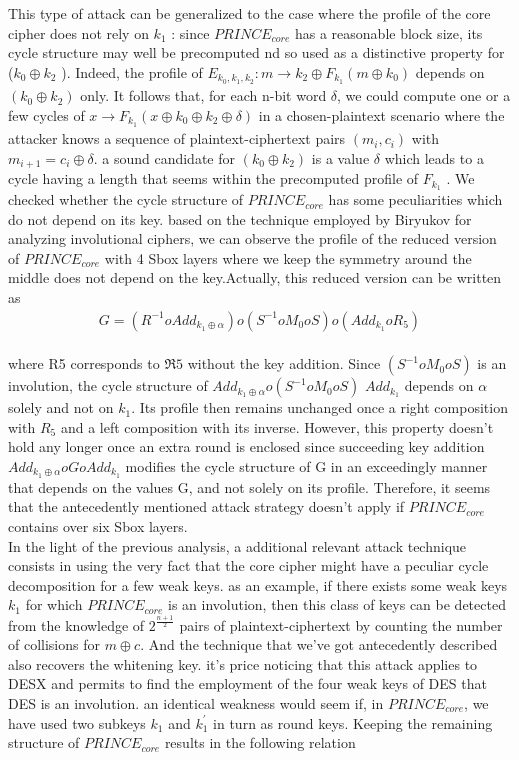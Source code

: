 \documentclass{transcrypto}
\begin{document}
This type of attack can be generalized to the case where the profile of the core cipher does not rely on $k_{1}$ : since $PRINCE_{core}$ has a reasonable block size, its cycle structure may well be precomputed nd so used as a distinctive property for ($k_{0} \oplus k_{2}$ ). Indeed, the profile of $E_{k_{0} ,k_{1},k_{2}}: m \xrightarrow[]{} k_{2} \oplus F_{k_{1}}(m \oplus k_{0})$
depends on $(k_{0} \oplus k_{2})$ only. It follows that, for each n-bit word $\delta$, we could compute
one or a few cycles of $x \xrightarrow[]{} F_{k_{1}}(x \oplus k_{ 0}  \oplus k_{2} \oplus \delta)$ in a chosen-plaintext scenario where the attacker knows a sequence of plaintext-ciphertext pairs $(m_{i} , c_{i} )$ with $m_{i+1} = c_{i} \oplus \delta$. a sound candidate for $(k_{0} \oplus k_{2} )$ is a value $\delta$ which leads to a cycle having a length that seems within the precomputed profile of $F_{k_{1}}$ . We checked whether the cycle structure of $PRINCE_{core}$ has some peculiarities which do not depend on its key. based on the technique employed by Biryukov for analyzing involutional ciphers, we can observe the profile of the reduced version of $PRINCE_{core}$ with 4 Sbox layers where we keep the symmetry around the middle does not depend on the key.Actually, this reduced version can be written as  
\begin{align*}
G =(R^{−1} o Add_{k_{1} \oplus \alpha})o (S^{-1} o M_{0} o S) o (Add_{k_{1}} o R_{5})
\end{align*}
\\
where R5 corresponds to $\Re5$ without the key addition. Since $(S^{−1} o M_{0} o S)$ is an involution, the cycle structure of $Add_{k_{1} \oplus \alpha} o (S^{-1} o M_{0} o S)$ $Add_{k_{1}}$ depends on $\alpha$ solely and not on $k_{1}$. Its profile then remains unchanged once a right composition with $R_{5}$ and a left composition with its inverse. However, this property doesn't hold any longer once an extra round is enclosed since succeeding key addition $Add_{k_{1} \oplus \alpha} o G o Add_{k_{1}}$ modifies the cycle structure of G in an exceedingly manner that depends on the values G, and not solely on its profile. Therefore, it seems that the antecedently mentioned attack strategy doesn't apply if $PRINCE_{core}$ contains over six Sbox layers. 
\\
In the light of the previous analysis, a additional relevant attack technique consists in using the very fact that the core cipher might have a peculiar cycle decomposition for a few weak keys. as an example, if there exists some weak keys $k_{1}$ for which $PRINCE_{core}$ is an involution, then this class of keys can be detected from the knowledge of $2^{\frac{n+1}{2}}$ pairs of plaintext-ciphertext by counting the number of collisions for $m \oplus c$. And the technique that we've got antecedently described also recovers the whitening key. it's price noticing that this attack applies to DESX and permits to find the employment of the four weak keys of DES that DES is an involution. an identical weakness would seem if,  in $PRINCE_{core}$, we have used two subkeys $k_{1}$ and $k^{'}_{1}$ in turn as round keys. Keeping the remaining structure of $PRINCE_{core}$ results in the following relation
\end{document}
